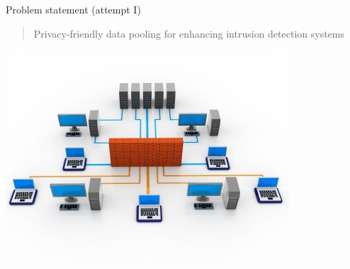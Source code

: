\documentclass[11pt,t]{beamer}
\begin{document}
\begin{frame}[plain,c]{Problem statement (attempt I)}
\begin{center}
\begin{quote}
    Privacy-friendly data pooling for enhancing intrusion detection systems
\end{quote}
\includegraphics[width=.6\textwidth]{nids}
\end{center}
\end{frame}
\end{document}
